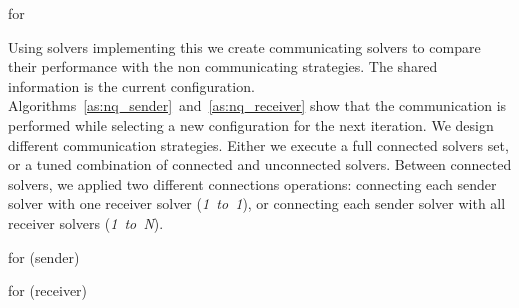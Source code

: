\begin{algorithm}[H]
\dontprintsemicolon
\SetNoline
{}
\caption{\As{} for \NQP}\label{as:nq}
\end{algorithm}

Using solvers implementing this \as{} we create communicating solvers to compare their performance with the non communicating strategies. The shared information is the current configuration. Algorithms~\ref{as:nq_sender}~and~\ref{as:nq_receiver} show that the communication is performed while selecting a new configuration for the next iteration. We design different communication strategies. Either we execute a full connected solvers set, or a tuned combination of connected and unconnected solvers. Between connected solvers, we applied two different connections operations: connecting each sender solver with one receiver solver ({\it 1~to~1}), or connecting each sender solver with all receiver solvers ({\it 1~to~N}).

\begin{algorithm}[H]
\dontprintsemicolon
\SetNoline
{}
\caption{\As{} for \NQP{} (sender)}\label{as:nq_sender}
\end{algorithm}

\begin{algorithm}[H]
\dontprintsemicolon
\SetNoline
{}
\caption{\As{} for \NQP{} (receiver)}\label{as:nq_receiver}
\end{algorithm}

